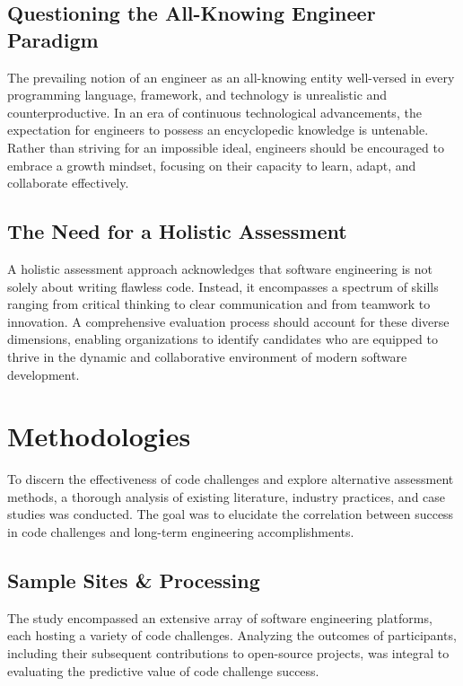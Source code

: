 \documentclass[
    a4paper, %
    10pt, %
    unnumberedsections, %
    twoside, %
]{LTJournalArticle}
\begin{document}
\subsection{Questioning the All-Knowing Engineer Paradigm}

The prevailing notion of an engineer as an all-knowing entity well-versed in every programming language, framework, and technology is unrealistic and counterproductive. In an era of continuous technological advancements, the expectation for engineers to possess an encyclopedic knowledge is untenable. Rather than striving for an impossible ideal, engineers should be encouraged to embrace a growth mindset, focusing on their capacity to learn, adapt, and collaborate effectively.

\subsection{The Need for a Holistic Assessment}

A holistic assessment approach acknowledges that software engineering is not solely about writing flawless code. Instead, it encompasses a spectrum of skills ranging from critical thinking to clear communication and from teamwork to innovation. A comprehensive evaluation process should account for these diverse dimensions, enabling organizations to identify candidates who are equipped to thrive in the dynamic and collaborative environment of modern software development.


\section{Methodologies}

To discern the effectiveness of code challenges and explore alternative assessment methods, a thorough analysis of existing literature, industry practices, and case studies was conducted. The goal was to elucidate the correlation between success in code challenges and long-term engineering accomplishments.

\subsection{Sample Sites \& Processing}

The study encompassed an extensive array of software engineering platforms, each hosting a variety of code challenges. Analyzing the outcomes of participants, including their subsequent contributions to open-source projects, was integral to evaluating the predictive value of code challenge success.
\end{document}
